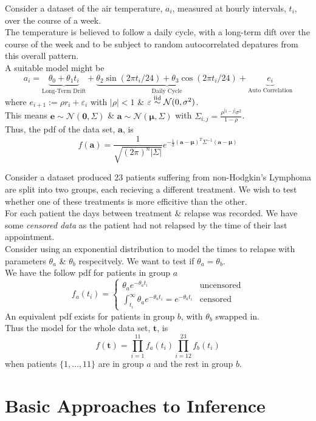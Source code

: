\documentclass[11pt,a4paper]{article}
\begin{document}
Consider a dataset of the air temperature, $a_i$, measured at hourly intervals, $t_i$, over the course of a week.\\
The temperature is believed to follow a daily cycle, with a long-term dift over the course of the week and to be subject to random autocorrelated depatures from this overall pattern.\\
A suitable model might be
$$a_i=\underbrace{\theta_0+\theta_1t_i}_\text{Long-Term Drift}+\underbrace{\theta_2\sin(2\pi t_i/24)+\theta_3\cos(2\pi t_i/24)}_\text{Daily Cycle}+\underbrace{e_i}_\text{Auto Correlation}$$
where $e_{i+1}:=\rho r_i+\varepsilon_i$ with $|\rho|<1$ \& $\varepsilon\overset{\text{iid}}{\sim}\mathcal{N}(0,\sigma^2)$.\\
This means $\textbf{e}\sim\mathcal{N}(\pmb0,\Sigma)$ \& $\textbf{a}\sim\mathcal{N}(\pmb\mu,\Sigma)$ with $\Sigma_{i,j}=\frac{\rho^{|1-j|}\sigma^2}{1-\rho}$.\\
Thus, the pdf of the data set, $\textbf{a}$, is
$$f(\textbf{a})=\frac{1}{\sqrt{(2\pi)^n|\Sigma|}}e^{-\frac{1}{2}(\textbf{a}-\pmb\mu)^T\Sigma^{-1}(\textbf{a}-\pmb\mu)}$$

Consider a dataset produced 23 patients suffering from non-Hodgkin's Lymphoma are split into two groups, each recieving a different treatment. We wish to test whether one of these treatments is more efficitive than the other.\\
For each patient the days between treatment \& relapse was recorded. We have some \textit{censored data} as the patient had not relapsed by the time of their last appointment.\\
Consider using an exponential distribution to model the times to relapse with parameters $\theta_a$ \& $\theta_b$ respecitvely. We want to test if $\theta_a=\theta_b$.\\
We have the follow pdf for patients in group $a$
$$f_a(t_i)=\begin{cases}\theta_ae^{-\theta_at_i}&\text{uncensored}\\\int_{t_i}^\infty\theta_ae^{-\theta_at_i}=e^{-\theta_at_i}&\text{censored}\end{cases}$$
An equivalent pdf exists for patients in group $b$, with $\theta_b$ swapped in.\\
Thus the model for the whole data set, $\textbf{t}$, is
$$f(\textbf{t})=\prod_{i=1}^{11}f_a(t_i)\prod_{i=12}^{23}f_b(t_i)$$
when patients $\{1,\dots,11\}$ are in group $a$ and the rest in group $b$.

\section{Basic Approaches to Inference}
\end{document}
